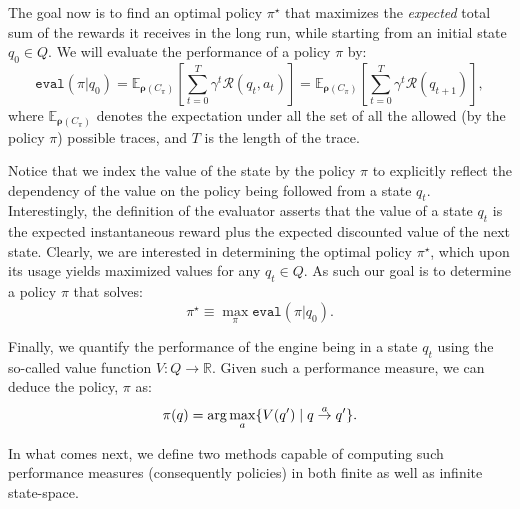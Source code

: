 The goal now is to find an optimal policy $\pi^{\star}$ that maximizes the \emph{expected} total sum of the rewards it receives in the long run, while starting from an initial state $q_{0} \in Q$. We will evaluate the performance of a policy $\pi$ by:
\begin{equation}
\label{Eq:ValueOne}
\texttt{eval}({\pi}|q_{0}) = \mathbb{E}_{\bm{\rho}(C_\pi)} \left[\sum_{t=0}^{T} \gamma^{t}\mathcal{R}(q_{t},a_{t})\right]= \mathbb{E}_{\bm{\rho}(C_\pi)} \left[\sum_{t=0}^{T} \gamma^{t}\mathcal{R}(q_{t+1})\right],
\end{equation}
where  $\mathbb{E}_{\bm{\rho}(C_\pi)}$ denotes the expectation under all the set of all the allowed (by the policy $\pi$) possible traces, and $T$ is the length of the trace. 


Notice that we index the value of the state by the policy $\pi$ to explicitly reflect the dependency of the value on the policy being followed from a state $q_{t}$. Interestingly, the definition of the evaluator asserts that the value of a state $q_{t}$ is the expected instantaneous reward plus the expected discounted value of the next state. Clearly, we are interested in determining the optimal policy $\pi^{\star}$, which upon its usage yields maximized values for any $q_{t} \in Q$. As such our goal is to determine a policy $\pi$ that solves:
\begin{equation*}
\pi^{\star} \equiv \max_{\pi} \texttt{eval}({\pi}|q_{0}). 
\end{equation*}



Finally, we quantify the performance of the engine being in a state $q_{t}$ using the so-called value function $V: {Q} \rightarrow \mathbb{R}$. Given such a performance measure, we can deduce the policy, $\pi$ as: 
\begin{equation}
\label{Eq:Policy}
\pi(q) = \arg\max_{a} \{V(q') \mid q \goesto[a] q'\}.
\end{equation}

In what comes next, we define two methods capable of computing such performance measures (consequently policies) in both finite as well as infinite state-space. 

